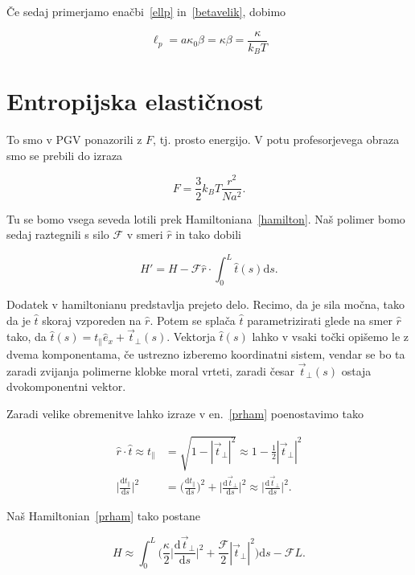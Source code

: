 \documentclass[12pt, a4 paper]{article}
\renewcommand{\t}{
	\ensuremath{\hat{t}}
}
\renewcommand{\d}{
	\ensuremath{\mathrm{d}}
}
\newcommand{\od}[2]{
	\ensuremath{\frac{\d #1}{\d #2}}
}
\newcommand{\tp}{
	\ensuremath{\vec{t}_\perp}
}
\newcommand{\tv}{
	\ensuremath{t_\parallel}
}
\newcommand{\F}{
	\ensuremath{\mathcal{F}}
}
\begin{document}
\v Ce sedaj primerjamo ena\v cbi~\eqref{ellp} in~\eqref{betavelik}, dobimo

\begin{equation}
	\ell_p = a\kappa_0\beta = \kappa\beta = \frac{\kappa}{k_B T}
\end{equation}


\section{Entropijska elasti\v cnost}

To smo v PGV ponazorili z $F$, tj. prosto energijo. V potu profesorjevega obraza smo se prebili do izraza

\begin{equation}
	F = \frac{3}{2} k_B T \frac{r^2}{Na^2}.
\end{equation}

Tu se bomo vsega seveda lotili prek Hamiltoniana~\eqref{hamilton}. Na\v s polimer bomo sedaj raztegnili s
silo $\F$ v smeri $\hat{r}$ in tako dobili

\begin{equation}
	H' = H - \F\hat{r} \cdot \int_0^L \t(s)\d s. \label{prham}
\end{equation}

Dodatek v hamiltonianu predstavlja prejeto delo. Recimo, da je sila mo\v cna, tako da je $\t$ skoraj
vzporeden na $\hat{r}$. Potem se spla\v ca $\t$ parametrizirati glede na smer $\hat{r}$ tako, da
$\t(s) = \tv\hat{e}_x + \tp (s)$. Vektorja $\t(s)$ lahko v vsaki to\v cki opi\v semo le z dvema komponentama,
\v ce ustrezno izberemo koordinatni sistem, vendar se bo ta zaradi zvijanja polimerne klobke moral vrteti,
zaradi \v cesar $\tp (s)$ ostaja dvokomponentni vektor.

Zaradi velike obremenitve lahko izraze v en.~\eqref{prham} poenostavimo tako

\begin{align}
	\hat{r}\cdot\t \approx \tv &= \sqrt{1 - |\tp|^2} \approx 1 - \frac{1}{2}|\tp|^2 \label{tivu} \\
	\bigg|\od{\tv}{s}\bigg|^2 &= \bigg(\od{\tv}{s}\bigg)^2 + \bigg|\od{\tp}{s}\bigg|^2 \approx
		\bigg|\od{\tp}{s}\bigg|^2.
\end{align}

Na\v s Hamiltonian~\eqref{prham} tako postane

\begin{equation}
	H \approx \int_0^L\bigg(\frac{\kappa}{2}\bigg|\od{\tp}{s}\bigg|^2 + \frac{\F}{2}|\tp|^2\bigg)\d s - \F L.
	\label{harm}
\end{equation}
\end{document}
